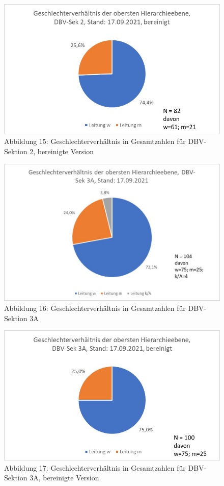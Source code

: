 \documentclass[a4paper,
fontsize=11pt,
oneside,
numbers=noperiodatend,
parskip=half-,
bibliography=totoc,
final
]{scrartcl}
\begin{document}
\begin{figure}
\centering
\includegraphics{img/Abb_15_DBV-Sek2_gesamt_bereinigt.jpg}
\caption{Abbildung 15: Geschlechterverhältnis in Gesamtzahlen für
DBV-Sektion 2, bereinigte Version}
\end{figure}

\begin{figure}
\centering
\includegraphics{img/Abb_16_DBV-Sek3A_gesamt.jpg}
\caption{Abbildung 16: Geschlechterverhältnis in Gesamtzahlen für
DBV-Sektion 3A}
\end{figure}

\begin{figure}
\centering
\includegraphics{img/Abb_17_DBV-Sek3A_gesamt_bereinigt.jpg}
\caption{Abbildung 17: Geschlechterverhältnis in Gesamtzahlen für
DBV-Sektion 3A, bereinigte Version}
\end{figure}
\end{document}
